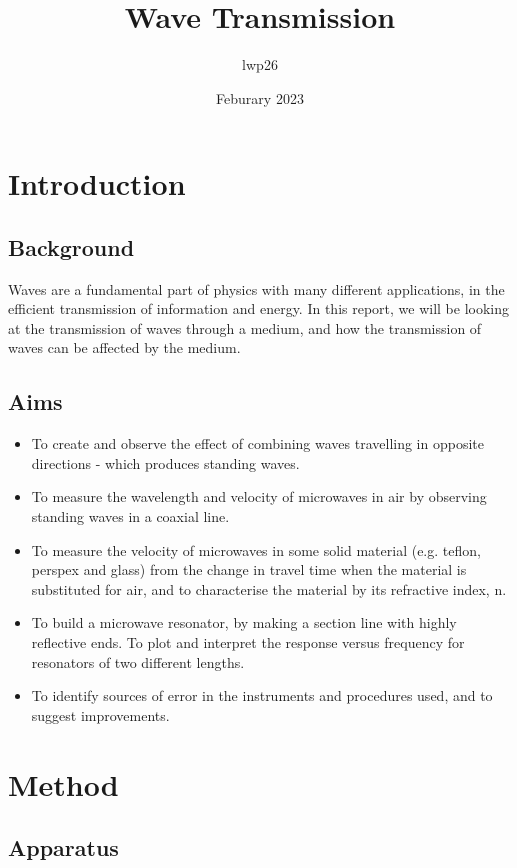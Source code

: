\documentclass[12pt]{article}
\begin{document}
\title{Wave Transmission}
\author{lwp26}
\date{Feburary 2023}
\maketitle


\section{Introduction}

\subsection{Background}

Waves are a fundamental part of physics with many different applications,
in the efficient transmission of information and energy. 
In this report, we will be looking at the transmission of waves through a medium, 
and how the transmission of waves can be affected by the medium.


\subsection{Aims}
\begin{itemize}
    \item To create and observe the effect of combining waves travelling in opposite directions - 
    which produces standing waves.
    \item To measure the wavelength and velocity of microwaves in air by observing standing waves
    in a coaxial line.
    \item To measure the velocity of microwaves in some solid material (e.g. teflon, perspex and
    glass) from the change in travel time when the material is substituted for air, and to
    characterise the material by its refractive index, n.
    \item To build a microwave resonator, by making a section line with highly reflective ends. To
    plot and interpret the response versus frequency for resonators of two different lengths.
    \item To identify sources of error in the instruments and procedures used, and to suggest
    improvements.
\end{itemize}

\section{Method}

\subsection{Apparatus}
\end{document}
